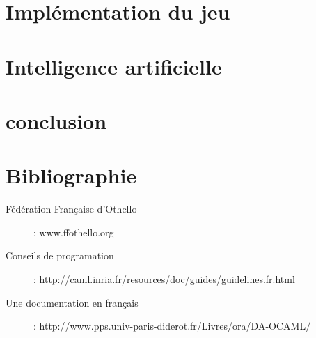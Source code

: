 \documentclass[10pt,a4paper]{report}
\begin{document}
\part{Implémentation du jeu}

\part{Intelligence artificielle}

\part{conclusion}

\part{Bibliographie}
\begin{description}
\item[Fédération Française d'Othello] : www.ffothello.org
\item[Conseils de programation] : http://caml.inria.fr/resources/doc/guides/guidelines.fr.html
\item[Une documentation en français] : http://www.pps.univ-paris-diderot.fr/Livres/ora/DA-OCAML/
\end{description}
\end{document}
